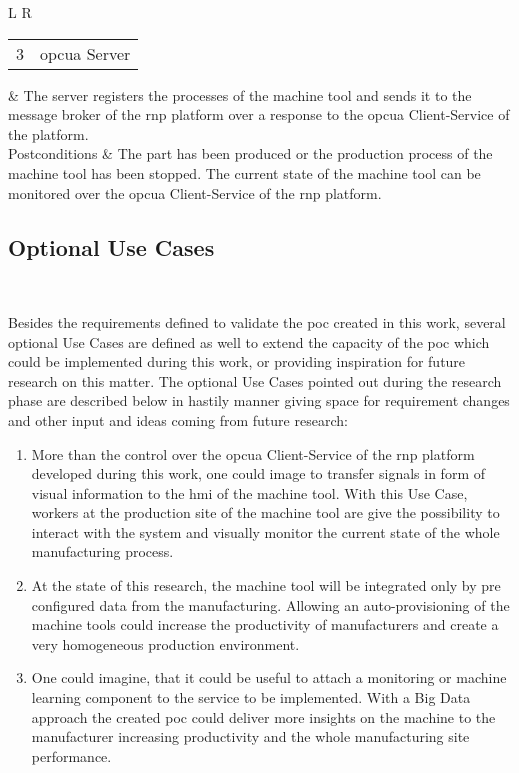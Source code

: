 \documentclass[
a4paper,
twoside,
headsepline,
cleardoublepage=empty,
parskip=half,
draft=false
]{scrbook}
\begin{document}
\begin{table}[htbp]
\begin{tabular}{L R}
						\\ \midrule
						\begin{tabular}{c c} 3 & \gls{opcua} Server \end{tabular} & The server registers the processes of the machine tool and sends it to the message broker of the \gls{rnp} platform over a response to the \gls{opcua} Client-Service of the platform.
						\\ \midrule
						Postconditions & The part has been produced or the production process of the machine tool has been stopped. The current state of the machine tool can be monitored over the \gls{opcua} Client-Service of the \gls{rnp} platform.
						\\ \bottomrule
					\end{tabular}
				\end{table}
			
	\newpage

			\subsection{Optional Use Cases} \label{subsec:optional}

				Besides the requirements defined to validate the \gls{poc} created in this work, several optional Use Cases are defined as well to extend the capacity of the \gls{poc} which could be implemented during this work, or providing inspiration for future research on this matter.
				The optional Use Cases pointed out during the research phase are described below in hastily manner giving space for requirement changes and other input and ideas coming from future research:

				\begin{enumerate}

					\item More than the control over the \gls{opcua} Client-Service of the \gls{rnp} platform developed during this work, one could image to transfer signals in form of visual information to the \gls{hmi} of the machine tool. With this Use Case, workers at the production site of the machine tool are give the possibility to interact with the system and visually monitor the current state of the whole manufacturing process.

					\item At the state of this research, the machine tool will be integrated only by pre configured data from the manufacturing. 
					Allowing an auto-provisioning of the machine tools could increase the productivity of manufacturers and create a very homogeneous production environment.

					\item One could imagine, that it could be useful to attach a monitoring or machine learning component to the service to be implemented. With a Big Data approach the created \gls{poc} could deliver more insights on the machine to the manufacturer increasing productivity and the whole manufacturing site performance.

				\end{enumerate}
\end{document}
